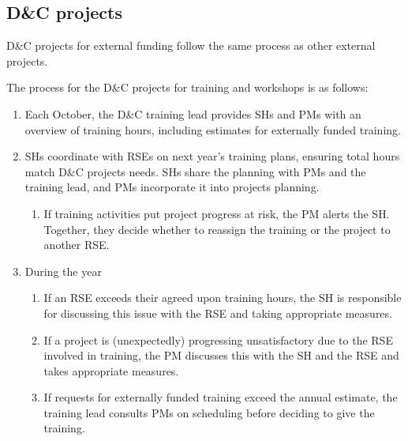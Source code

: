 \subsection{D\&C projects}
D\&C projects for external funding follow the same process as other external projects.

The process for the D\&C projects for training and workshops is as follows:
\begin{enumerate}[label=\arabic*),ref=\arabic*]
\item Each October, the D\&C training lead provides SHs and PMs with an overview of training hours, including estimates for externally funded training.
\item SHs coordinate with RSEs on next year's training plans, ensuring total hours match D\&C projects needs. SHs share the planning 
with PMs and the training lead, and PMs incorporate it into projects planning.
\begin{enumerate}[label=\alph*.,ref=\alph*]
\item If training activities put project progress at risk, the PM alerts the SH. Together, they decide whether to reassign the training or the project to another RSE.
\end{enumerate}
\item During the year
\begin{enumerate}[label=\alph*.,ref=\alph*]
\item If an RSE exceeds their agreed upon training hours, the SH is responsible for discussing this
issue with the RSE and taking appropriate measures.
\item If a project is (unexpectedly) progressing unsatisfactory due to the RSE involved in training,
the PM discusses this with the SH and the RSE and takes appropriate measures.
\item If requests for externally funded training exceed the annual estimate, the training lead consults PMs on scheduling before deciding to give the training.
\end{enumerate}
\end{enumerate}


